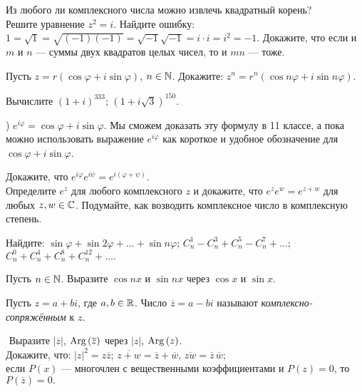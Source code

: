 \documentclass[a4paper, 12pt]{article}
\begin{document}
 Из любого ли комплексного числа можно извлечь
квадратный корень? \\
 Решите уравнение $z^2=i$.
 Найдите ошибку: $1=\sqrt 1=\sqrt{(-1)(-1)}=\sqrt{-1}\sqrt{-1}=i\cdot i=i^2=-1$.
Докажите, что если и $m$ и $n$ --- суммы двух квадратов целых чисел, то и $mn$ --- тоже.

 Пусть $z=r(\cos\varphi+i\sin\varphi)$, $n\in\mathbb{N}$.
Докажите: %
$z^n=r^n(\cos n\varphi+i\sin n\varphi)$.

Вычислите  $(1+i)^{333}$;  $(1+i\sqrt{3})^{150}$.


)
$e^{i\varphi}=\cos\varphi+i\sin\varphi$. Мы сможем доказать эту формулу в 11 классе, а пока  можно использовать выражение $e^{i\varphi}$ как короткое и удобное обозначение для $\cos\varphi+i\sin\varphi$.

 Докажите, что $e^{i\varphi}e^{i\psi}=e^{i(\varphi+\psi)}$.\\
 Определите $e^z$ для любого комплексного $z$ и докажите, что $e^ze^w=e^{z+w}$ для любых $z,w\in\mathbb{C}$.
 Подумайте, как возводить комплексное число в комплексную степень. %

Найдите: %
$\sin \varphi +\sin 2\varphi +\ldots +\sin n\varphi$;
$C_{n}^{1}-C_{n}^{3}+C_{n}^{5}-C_{n}^{7}+\dots;$
$C_{n}^{0}+C_{n}^{4}+C_{n}^{8}+C_{n}^{12}+\dots.$



Пусть $n\in\mathbb{N}$. Выразите $\cos nx$ и $\sin nx$ через $\cos{x}$ и $\sin{x}$.


Пусть $z=a+bi$, где $a,b\in\mathbb{R}$. Число $\overline{z}=a-bi$ называют
{\em комплексно-сопряжённым\/} к $z$.

 $\!\!\!$
 Выразите $|\overline{z}|$, ${\rm Arg}\,(\overline{z})$  через $|z|$, ${\rm Arg}\,(z)$.\\
%
Докажите, что:
$|z|^2=z\overline{z}$; %
$\overline{z+w}=\overline{z}+\overline{w}$,
$\overline{zw}=\overline{z}\,\overline{w}$;\\
если $P(x)$ --- многочлен с вещественными коэффициентами и $P(z)=0$, то $P(\overline{z})=0.$
\end{document}

